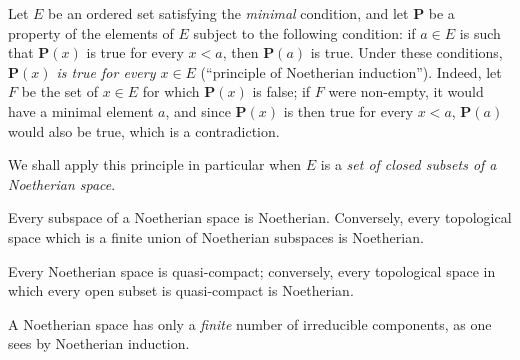 \begin{env}[2.2.2]
\label{0.2.2.2}
Let $E$ be an ordered set satisfying the \emph{minimal} condition, and let
$\boldsymbol{P}$ be a property of the elements of $E$ subject to the following condition: if
$a\in E$ is such that $\boldsymbol{P}(x)$ is true for every $x<a$, then $\boldsymbol{P}(a)$ is
true. Under these conditions, \emph{$\boldsymbol{P}(x)$ is true for every $x\in E$}
(``principle of Noetherian induction''). Indeed, let $F$ be the set of
$x\in E$ for which $\boldsymbol{P}(x)$ is false; if $F$ were non-empty, it would have a
minimal element $a$, and since $\boldsymbol{P}(x)$ is then true for every $x<a$, $\boldsymbol{P}(a)$
would also be true, which is a contradiction.

We shall apply this principle in particular when $E$ is a \emph{set
of closed subsets of a Noetherian space}.
\end{env}

\begin{env}[2.2.3]
\label{0.2.2.3}
Every subspace of a Noetherian space is Noetherian. Conversely, every
topological space which is a finite union of Noetherian subspaces is Noetherian.
\end{env}

\begin{env}[2.2.4]
\label{0.2.2.4}
Every Noetherian space is quasi-compact; conversely, every topological space
in which every open subset is quasi-compact is Noetherian.
\end{env}

\begin{env}[2.2.5]
\label{0.2.2.5}
A Noetherian space has only a \emph{finite} number of irreducible
components, as one sees by Noetherian induction.
\end{env}

